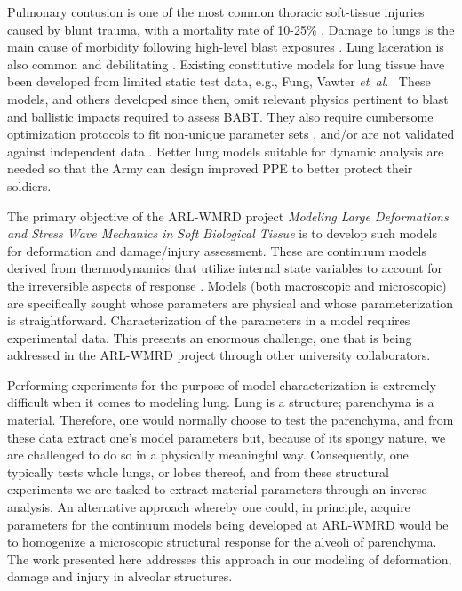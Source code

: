 Pulmonary contusion is one of the most common thoracic soft-tissue injuries caused by blunt trauma, with a mortality rate of 10-25\% \cite{Stitzeletal05}.  Damage to lungs is the main cause of morbidity following high-level blast exposures \cite{Stuhmilleretal88}.  Lung laceration is also common and debilitating \cite{VlessisTrunkey97}.  Existing constitutive models for lung tissue have been developed from limited static test data, e.g., Fung, Vawter \textit{et~al}.\ \cite{Fungetal78,Vawteretal79,Vawter80} These models, and others developed since then, omit relevant physics pertinent to blast and ballistic impacts required to assess BABT.  They also require cumbersome optimization protocols to fit non-unique parameter sets \cite{Gayziketal07,Gayziketal11}, and\slash or are not validated against independent data \cite{Yuenetal08}.  Better lung models suitable for dynamic analysis are needed so that the Army can design improved PPE to better protect their soldiers.

The primary objective of the ARL-WMRD project \textit{Modeling Large Deformations and Stress Wave Mechanics in Soft Biological Tissue\/} is to develop such models for deformation and damage\slash injury assessment.  These are continuum models derived from thermo\-dynamics that utilize internal state variables to account for the irreversible aspects of response \cite{ClaytonFreed19,ClaytonFreed20}.  Models (both macro\-scopic and micro\-scopic) are specifically sought whose parameters are physical and whose parameterization is straightforward.  Characterization of the parameters in a model requires experimental data.  This presents an enormous challenge, one that is being addressed in the ARL-WMRD project through other university collaborators.  

Performing experiments for the purpose of model characterization is extremely difficult when it comes to modeling lung.  Lung is a structure; parenchyma is a material.  Therefore, one would normally choose to test the parenchyma, and from these data extract one's model parameters but, because of its spongy nature, we are challenged to do so in a physically meaningful way.  Consequently, one typically tests whole lungs, or lobes thereof, and from these structural experiments we are tasked to extract material parameters through an inverse analysis.  An alternative approach whereby one could, in principle, acquire parameters for the continuum models being developed at ARL-WMRD would be to homo\-genize a microscopic structural response for the alveoli of parenchyma.  The work presented here addresses this approach in our modeling of deformation, damage and injury in alveolar structures.

